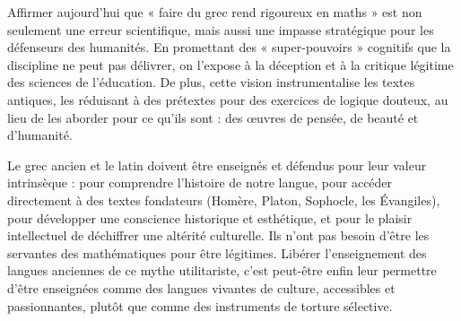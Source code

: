Affirmer aujourd'hui que « faire du grec rend rigoureux en maths » est non seulement une erreur
scientifique, mais aussi une impasse stratégique pour les défenseurs des humanités. En promettant
des « super-pouvoirs » cognitifs que la discipline ne peut pas délivrer, on l'expose à la déception
et à la critique légitime des sciences de l'éducation. De plus, cette vision instrumentalise les
textes antiques, les réduisant à des prétextes pour des exercices de logique douteux, au lieu de les
aborder pour ce qu'ils sont : des œuvres de pensée, de beauté et d'humanité.

Le grec ancien et le latin doivent être enseignés et défendus pour leur valeur intrinsèque : pour
comprendre l'histoire de notre langue, pour accéder directement à des textes fondateurs (Homère,
Platon, Sophocle, les Évangiles), pour développer une conscience historique et esthétique, et pour
le plaisir intellectuel de déchiffrer une altérité culturelle. Ils n'ont pas besoin d'être les
servantes des mathématiques pour être légitimes. Libérer l'enseignement des langues anciennes de ce
mythe utilitariste, c'est peut-être enfin leur permettre d'être enseignées comme des langues
vivantes de culture, accessibles et passionnantes, plutôt que comme des instruments de torture
sélective.

